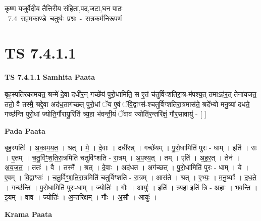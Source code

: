 \documentclass[17pt]{extarticle}
\begin{document}
\begin{titlepage}
    \begin{center}
 
\begin{sanskrit}
    { \Large
    कृष्ण यजुर्वेदीय तैत्तिरीय संहिता,पद,जटा,घन पाठः 
    }
    \\
    \vspace{2.5cm}
    \mbox{ \Large
    7.4      सप्तमकाण्डे चतुर्थः प्रश्नः - सत्रकर्मनिरूपणं   }
\end{sanskrit}
\end{center}

\end{titlepage}
\tableofcontents
{}
\pagebreak


\section{ TS 7.4.1.1 }

\textbf{TS 7.4.1.1 } \newline
\textbf{Samhita Paata} \newline

बृह॒स्पति॑रकामयत॒ श्रन्मे॑ दे॒वा दधी॑र॒न् गच्छे॑यं पुरो॒धामिति॒ स ए॒तं च॑तुर्विꣳशतिरा॒त्र-म॑पश्य॒त् तमाऽह॑र॒त् तेना॑यजत॒ ततो॒ वै तस्मै॒ श्रद्दे॒वा अद॑ध॒ताग॑च्छत् पुरो॒धां ॅय ए॒वं ॅवि॒द्वाꣳस॑-श्चतुर्विꣳशतिरा॒त्रमास॑ते॒ श्रदे᳚भ्यो मनु॒ष्या॑ दधते॒ गच्छ॑न्ति पुरो॒धां ज्योति॒र्गौरायु॒रिति॑ त्र्य॒हा भ॑वन्ती॒यं ॅवाव ज्योति॑र॒न्तरि॑क्षं॒ गौर॒सावायु॑ - [  ] \newline

\textbf{Pada Paata} \newline

बृह॒स्पतिः॑ । अ॒का॒म॒य॒त॒ । श्रत् । मे॒ । दे॒वाः । दधी॑रन्न् । गच्छे॑यम् । पु॒रो॒धामिति॑ पुरः - धाम् । इति॑ । सः । ए॒तम् । च॒तु॒र्विꣳ॒॒श॒ति॒रा॒त्रमिति॑ चतुर्विꣳशति - रा॒त्रम् । अ॒प॒श्य॒त् । तम् । एति॑ । अ॒ह॒र॒त् । तेन॑ । अ॒य॒ज॒त॒ । ततः॑ । वै । तस्मै᳚ । श्रत् । दे॒वाः । अद॑धत । अग॑च्छत् । पु॒रो॒धामिति॑ पुरः - धाम् । ये । ए॒वम् । वि॒द्वाꣳसः॑ । च॒तु॒र्विꣳ॒॒श॒ति॒रा॒त्रमिति॑ चतुर्विꣳशति - रा॒त्रम् । आस॑ते । श्रत् । ए॒भ्यः॒ । म॒नु॒ष्याः᳚ । द॒ध॒ते॒ । गच्छ॑न्ति । पु॒रो॒धामिति॑ पुरः-धाम् । ज्योतिः॑ । गौः । आयुः॑ । इति॑ । त्र्य॒हा इति॑ त्रि - अ॒हाः । भ॒व॒न्ति॒ । इ॒यम् । वाव । ज्योतिः॑ । अ॒न्तरि॑क्षम् । गौः । अ॒सौ । आयुः॑ ।  \newline


\textbf{Krama Paata} \newline
\end{document}
